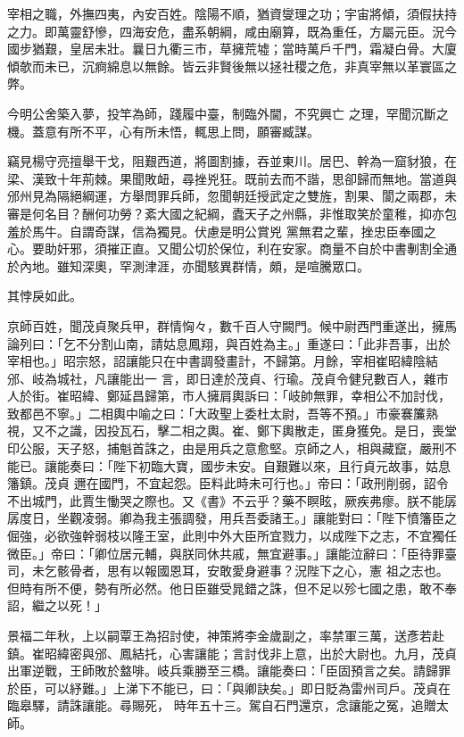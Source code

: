 \begin{pinyinscope}
 宰相之職，外撫四夷，內安百姓。陰陽不順，猶資燮理之功；宇宙將傾，須假扶持之力。即萬靈舒慘，四海安危，盡系朝綱，咸由廟算，既為重任，方屬元臣。況今國步猶艱，皇居未壯。曩日九衢三市，草擁荒墟；當時萬戶千門，霜凝白骨。大廈傾欹而未已，沉痾綿息以無餘。皆云非賢後無以拯社稷之危，非真宰無以革寰區之弊。



 今明公舍築入夢，投竿為師，踐履中臺，制臨外閫，不究興亡
 之理，罕聞沉斷之機。蓋意有所不平，心有所未悟，輒思上問，願審臧謀。



 竊見楊守亮擅舉干戈，阻艱西道，將圖割據，吞並東川。居巴、幹為一窟豺狼，在梁、漢致十年荊棘。果聞敗衄，尋挫兇狂。既前去而不諧，思卻歸而無地。當道與邠州見為隔絕綱運，方舉問罪兵師，忽聞朝廷授武定之雙旌，割果、閬之兩郡，未審是何名目？酬何功勞？紊大國之紀綱，蠹天子之州縣，非惟取笑於童稚，抑亦包羞於馬牛。自謂奇謀，信為獨見。伏慮是明公賞兇
 黨無君之輩，挫忠臣奉國之心。要助奸邪，須摧正直。又聞公切於保位，利在安家。商量不自於中書剸割全通於內地。雖知深奧，罕測津涯，亦聞駭異群情，頗，是喧騰眾口。



 其悖戾如此。



 京師百姓，聞茂貞聚兵甲，群情恟々，數千百人守闕門。候中尉西門重遂出，擁馬論列曰：「乞不分割山南，請姑息鳳翔，與百姓為主。」重遂曰：「此非吾事，出於宰相也。」昭宗怒，詔讓能只在中書調發畫計，不歸第。月餘，宰相崔昭緯陰結邠、岐為城社，凡讓能出一
 言，即日達於茂貞、行瑜。茂貞令健兒數百人，雜市人於街。崔昭緯、鄭延昌歸第，市人擁肩輿訴曰：「岐帥無罪，幸相公不加討伐，致都邑不寧。」二相輿中喻之曰：「大政聖上委杜太尉，吾等不預。」市豪褰簾熟視，又不之識，因投瓦石，擊二相之輿。崔、鄭下輿散走，匿身獲免。是日，喪堂印公服，天子怒，捕魁首誅之，由是用兵之意愈堅。京師之人，相與藏竄，嚴刑不能已。讓能奏曰：「陛下初臨大寶，國步未安。自艱難以來，且行貞元故事，姑息籓鎮。茂貞
 邇在國門，不宜起怨。臣料此時未可行也。」帝曰：「政刑削弱，詔令不出城門，此賈生慟哭之際也。又《書》不云乎？藥不瞑眩，厥疾弗瘳。朕不能孱孱度日，坐觀凌弱。卿為我主張調發，用兵吾委諸王。」讓能對曰：「陛下憤籓臣之倔強，必欲強幹弱枝以隆王室，此則中外大臣所宜戮力，以成陛下之志，不宜獨任微臣。」帝曰：「卿位居元輔，與朕同休共戚，無宜避事。」讓能泣辭曰：「臣待罪臺司，未乞骸骨者，思有以報國恩耳，安敢愛身避事？況陛下之心，憲
 祖之志也。但時有所不便，勢有所必然。他日臣雖受晁錯之誅，但不足以殄七國之患，敢不奉詔，繼之以死！」



 景福二年秋，上以嗣覃王為招討使，神策將李金歲副之，率禁軍三萬，送彥若赴鎮。崔昭緯密與邠、鳳結托，心害讓能；言討伐非上意，出於大尉也。九月，茂貞出軍逆戰，王師敗於盩啡。岐兵乘勝至三橋。讓能奏曰：「臣固預言之矣。請歸罪於臣，可以紓難。」上涕下不能已，曰：「與卿訣矣。」即日貶為雷州司戶。茂貞在臨皋驛，請誅讓能。尋賜死，
 時年五十三。駕自石門還京，念讓能之冤，追贈太師。




\end{pinyinscope}
